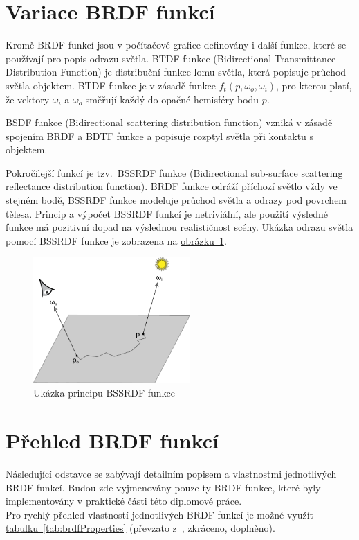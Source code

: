 \documentclass[czech,master]{diploma}
\newcommand{\point}{p}
\newcommand{\btdf}{f_t\left(\point,\omega_{o},\omega_{i}\right)}
\newcommand{\inVec}{\omega_{i}}
\newcommand{\outVec}{\omega_{o}}
\begin{document}
\section{Variace BRDF funkcí}
Kromě BRDF funkcí jsou v počítačové grafice definovány i další funkce, které se používají pro popis odrazu světla. BTDF funkce (Bidirectional Transmittance Distribution Function) je distribuční funkce lomu světla, která popisuje průchod světla objektem. BTDF funkce je v zásadě funkce \(\btdf\), pro kterou platí, že vektory \(\inVec\) a \(\outVec\) směřují každý do opačné hemisféry bodu \(\point\).\par
BSDF funkce (Bidirectional scattering distribution function) vzniká v zásadě spojením BRDF a BDTF funkce a popisuje rozptyl světla při kontaktu s objektem.\par
Pokročilejší funkcí je tzv.\ BSSRDF funkce (Bidirectional sub-surface scattering reflectance distribution function). BRDF funkce odráží příchozí světlo vždy ve stejném bodě, BSSRDF funkce modeluje průchod světla a odrazy pod povrchem tělesa. Princip a výpočet BSSRDF funkcí je netriviální, ale použití výsledné funkce má pozitivní dopad na výslednou realističnost scény. Ukázka odrazu světla pomocí BSSRDF funkce je zobrazena na \hyperref[fig:bssrdf]{obrázku~\ref{fig:bssrdf}}.

\begin{figure}[ht]
  \centering
  \includegraphics[width=6cm]{Figures/BSSRDF.pdf}%
  \caption[Ukázka principu BSSRDF funkce]{Ukázka principu BSSRDF funkce~\cite{PHARR2017313}}
  \label{fig:bssrdf}
\end{figure}

\section{Přehled BRDF funkcí}\label{sec:brdffunctions}
Následující odstavce se zabývají detailním popisem a vlastnostmi jednotlivých BRDF funkcí. Budou zde vyjmenovány pouze ty BRDF funkce, které byly implementovány v praktické části této diplomové práce. \\
Pro rychlý přehled vlastností jednotlivých BRDF funkcí je možné využít \hyperref[tab:brdfProperties]{tabulku~\ref{tab:brdfProperties}} (převzato z~\cite{BRDFOverview}, zkráceno, doplněno).
\end{document}
